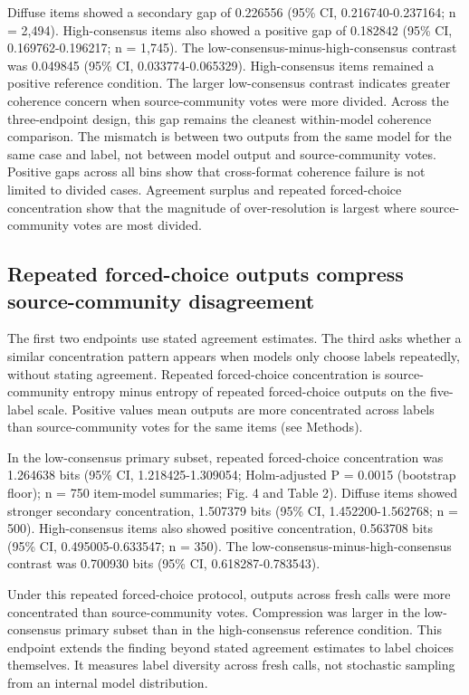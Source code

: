 \documentclass[11pt]{article}
\begin{document}
Diffuse items showed a secondary gap of 0.226556 (95\% CI, 0.216740-0.237164; n = 2,494). High-consensus items also showed a positive gap of 0.182842 (95\% CI, 0.169762-0.196217; n = 1,745). The low-consensus-minus-high-consensus contrast was 0.049845 (95\% CI, 0.033774-0.065329). High-consensus items remained a positive reference condition. The larger low-consensus contrast indicates greater coherence concern when source-community votes were more divided. Across the three-endpoint design, this gap remains the cleanest within-model coherence comparison. The mismatch is between two outputs from the same model for the same case and label, not between model output and source-community votes. Positive gaps across all bins show that cross-format coherence failure is not limited to divided cases. Agreement surplus and repeated forced-choice concentration show that the magnitude of over-resolution is largest where source-community votes are most divided.

\subsection{Repeated forced-choice outputs compress source-community disagreement}

The first two endpoints use stated agreement estimates. The third asks whether a similar concentration pattern appears when models only choose labels repeatedly, without stating agreement. Repeated forced-choice concentration is source-community entropy minus entropy of repeated forced-choice outputs on the five-label scale. Positive values mean outputs are more concentrated across labels than source-community votes for the same items (see Methods).

In the low-consensus primary subset, repeated forced-choice concentration was 1.264638 bits (95\% CI, 1.218425-1.309054; Holm-adjusted P = 0.0015 (bootstrap floor); n = 750 item-model summaries; Fig. 4 and Table 2). Diffuse items showed stronger secondary concentration, 1.507379 bits (95\% CI, 1.452200-1.562768; n = 500). High-consensus items also showed positive concentration, 0.563708 bits (95\% CI, 0.495005-0.633547; n = 350). The low-consensus-minus-high-consensus contrast was 0.700930 bits (95\% CI, 0.618287-0.783543).

Under this repeated forced-choice protocol, outputs across fresh calls were more concentrated than source-community votes. Compression was larger in the low-consensus primary subset than in the high-consensus reference condition. This endpoint extends the finding beyond stated agreement estimates to label choices themselves. It measures label diversity across fresh calls, not stochastic sampling from an internal model distribution.
\end{document}
